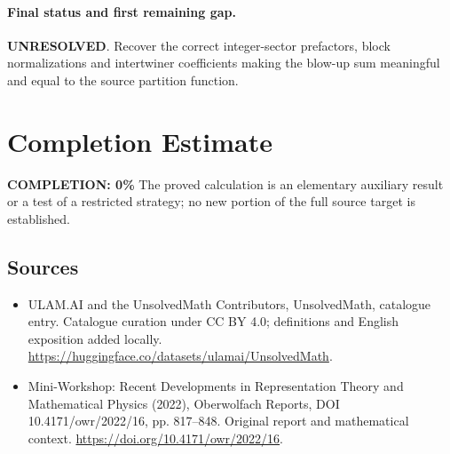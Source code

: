 \documentclass[11pt]{article}
\begin{document}
\paragraph{Final status and first remaining gap.}
\textbf{UNRESOLVED}. Recover the correct integer-sector prefactors, block normalizations and intertwiner coefficients making the blow-up sum meaningful and equal to the source partition function.

\section{Completion Estimate}
\noindent\textbf{COMPLETION: 0\%}
The proved calculation is an elementary auxiliary result or a test of a restricted strategy; no new portion of the full source target is established.

\subsection{Sources}
\begin{itemize}
\item[\hypertarget{source:statement:1}{S1}] ULAM.AI and the UnsolvedMath Contributors, UnsolvedMath, catalogue entry. Catalogue curation under CC BY 4.0; definitions and English exposition added locally.
\url{https://huggingface.co/datasets/ulamai/UnsolvedMath}.
\item[\hypertarget{source:statement:2}{S2}] Mini-Workshop: Recent Developments in Representation Theory and Mathematical Physics (2022), Oberwolfach Reports, DOI 10.4171/owr/2022/16, pp. 817--848. Original report and mathematical context.
\url{https://doi.org/10.4171/owr/2022/16}.
\end{itemize}
\label{end:statement}
\end{document}
